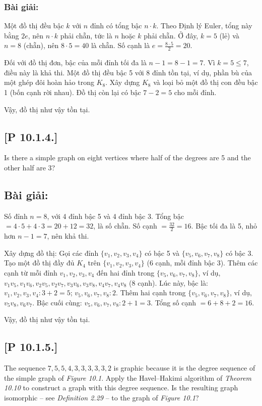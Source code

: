 \documentclass[a4paper,12pt]{article}
\begin{document}
\subsubsection*{Bài giải:}
Một đồ thị đều bậc \( k \) với \( n \) đỉnh có tổng bậc \( n \cdot k \). Theo Định lý Euler, tổng này bằng \( 2e \), nên \( n \cdot k \) phải chẵn, tức là \( n \) hoặc \( k \) phải chẵn. Ở đây, \( k = 5 \) (lẻ) và \( n = 8 \) (chẵn), nên \( 8 \cdot 5 = 40 \) là chẵn. Số cạnh là \( e = \frac{8 \cdot 5}{2} = 20 \).

Đối với đồ thị đơn, bậc của mỗi đỉnh tối đa là \( n-1 = 8-1 = 7 \). Vì \( k = 5 \leq 7 \), điều này là khả thi. Một đồ thị đều bậc 5 với 8 đỉnh tồn tại, ví dụ, phần bù của một ghép đôi hoàn hảo trong \( K_8 \). Xây dựng \( K_8 \) và loại bỏ một đồ thị con đều bậc 1 (bốn cạnh rời nhau). Đồ thị còn lại có bậc \( 7 - 2 = 5 \) cho mỗi đỉnh.

Vậy, đồ thị như vậy tồn tại.

\subsection*{[P 10.1.4.]} Is there a simple graph on eight vertices where half of the degrees are 5 and the other half are 3?
\subsection*{Bài giải:}
Số đỉnh \( n = 8 \), với 4 đỉnh bậc 5 và 4 đỉnh bậc 3. Tổng bậc \( = 4 \cdot 5 + 4 \cdot 3 = 20 + 12 = 32 \), là số chẵn. Số cạnh \( = \frac{32}{2} = 16 \). Bậc tối đa là 5, nhỏ hơn \( n-1 = 7 \), nên khả thi.

Xây dựng đồ thị: Gọi các đỉnh \( \{v_1, v_2, v_3, v_4\} \) có bậc 5 và \( \{v_5, v_6, v_7, v_8\} \) có bậc 3. Tạo một đồ thị đầy đủ \( K_4 \) trên \( \{v_1, v_2, v_3, v_4\} \) (6 cạnh, mỗi đỉnh bậc 3). Thêm các cạnh từ mỗi đỉnh \( v_1, v_2, v_3, v_4 \) đến hai đỉnh trong \( \{v_5, v_6, v_7, v_8\} \), ví dụ, \( v_1v_5, v_1v_6, v_2v_5, v_2v_7, v_3v_6, v_3v_8, v_4v_7, v_4v_8 \) (8 cạnh). Lúc này, bậc là: \( v_1, v_2, v_3, v_4: 3 + 2 = 5 \); \( v_5, v_6, v_7, v_8: 2 \). Thêm hai cạnh trong \( \{v_5, v_6, v_7, v_8\} \), ví dụ, \( v_5v_8, v_6v_7 \). Bậc cuối cùng: \( v_5, v_6, v_7, v_8: 2 + 1 = 3 \). Tổng số cạnh \( = 6 + 8 + 2 = 16 \).

Vậy, đồ thị như vậy tồn tại.

\subsection*{[P 10.1.5.]} The sequence $7, 5, 5, 4, 3, 3, 3, 3, 3, 2$ is graphic because it is the degree sequence of the simple graph of \textit{Figure 10.1}. Apply the Havel–Hakimi algorithm of \textit{Theorem 10.10} to construct a graph with this degree sequence. Is the resulting graph isomorphic – see \textit{Definition 2.29} – to the graph of \textit{Figure 10.1}?
\end{document}

